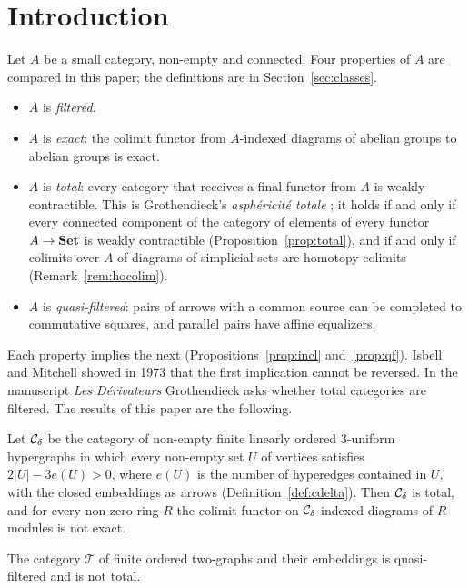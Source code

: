 \section{Introduction}

Let $A$ be a small category, non-empty and connected. Four properties of $A$
are compared in this paper; the definitions are in
Section~\ref{sec:classes}.
\begin{itemize}
\item $A$ is \emph{filtered}.
\item $A$ is \emph{exact}: the colimit functor from $A$-indexed diagrams of
 abelian groups to abelian groups is exact.
\item $A$ is \emph{total}: every category that receives a final functor from
 $A$ is weakly contractible. This is Grothendieck's \emph{asph\'ericit\'e
 totale} \cite{Der}; it holds if and only if every connected component of the
 category of elements of every functor $A\to\mathbf{Set}$ is weakly contractible
 (Proposition~\ref{prop:total}), and if and only if colimits over $A$ of
 diagrams of simplicial sets are homotopy colimits (Remark~\ref{rem:hocolim}).
\item $A$ is \emph{quasi-filtered}: pairs of arrows with a common source can be
 completed to commutative squares, and parallel pairs have affine equalizers.
\end{itemize}
Each property implies the next (Propositions~\ref{prop:incl}
and~\ref{prop:qf}). Isbell and Mitchell showed in 1973 that the first
implication cannot be reversed. In the manuscript \emph{Les D\'erivateurs}
Grothendieck asks whether total categories are filtered. The results of this
paper are the following.

\begin{theorem}\label{thm:A}
Let $\mathcal{C}_{\delta}$ be the category of non-empty finite linearly ordered $3$-uniform
hypergraphs
in which every non-empty set $U$ of vertices satisfies $2|U|-3e(U)>0$, where
$e(U)$ is the number of hyperedges contained in $U$, with the closed
embeddings as arrows \textup{(}Definition~\ref{def:cdelta}\textup{)}. Then $\mathcal{C}_{\delta}$ is
total, and for every non-zero ring $R$ the colimit functor on $\mathcal{C}_{\delta}$-indexed
diagrams of $R$-modules is not exact.
\end{theorem}

\begin{theorem}\label{thm:B}
The category $\mathcal T$ of finite ordered two-graphs and their embeddings
is quasi-filtered and is not total.
\end{theorem}

